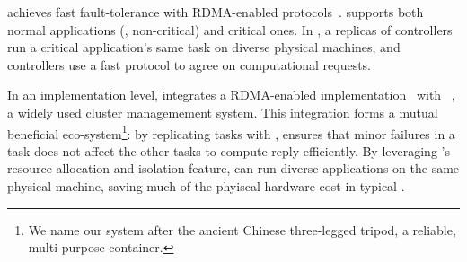 \xxx achieves fast fault-tolerance with RDMA-enabled 
\paxos protocols~\cite{dare:hpdc15,falcon:github}. \xxx supports both normal 
applications (\ie, non-critical) and critical ones. In \xxx, a replicas of 
controllers run a critical application's same task on diverse physical 
machines, and controllers use a fast \paxos protocol to agree on computational 
requests. 

In an implementation level, \xxx integrates a RDMA-enabled \paxos 
implementation~\cite{falcon:github} with \mesos~\cite{mesos}, a widely used 
cluster managemement system. This integration forms a mutual beneficial 
eco-system\footnote{We name our system after the ancient Chinese three-legged 
tripod, a reliable, multi-purpose container.}: by replicating tasks with 
\paxos, \xxx ensures that minor failures in a task does not affect the other 
tasks to compute reply efficiently. By leveraging \mesos's resource allocation 
and isolation feature, \xxx can run diverse applications on the same physical 
machine, saving much of the phyiscal hardware cost in typical \paxos.








